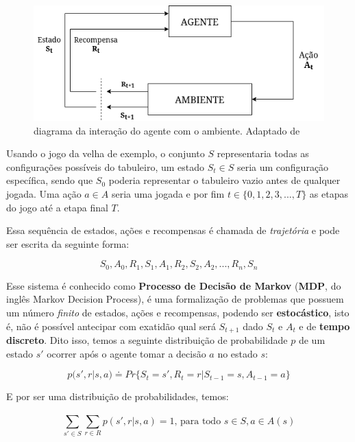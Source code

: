 \begin{figure}[h]
   \centering
   \includegraphics[scale=0.75]{figs/RL-diagram.drawio.png}
    \caption{diagrama da interação do agente com o ambiente. Adaptado de }
    \label{fig:rl-diagram}
 \end{figure}

Usando o jogo da velha de exemplo, o conjunto $S$ representaria todas as configurações possíveis do tabuleiro, um estado $S_t \in S$ seria um configuração específica, sendo que $S_0$ poderia representar o tabuleiro vazio antes de qualquer jogada. Uma ação $a \in A$ seria uma jogada e por fim $t \in \{0,1,2,3,..., T\}$ as etapas do jogo até a etapa final $T$.

Essa sequência de estados, ações e recompensas é chamada de \textit{trajetória} e pode ser escrita da seguinte forma:

\begin{equation} \label{trajectory}
   S_0, A_0, R_1, S_1, A_1, R_2, S_2, A_2, ... , R_n, S_n
\end{equation}

Esse sistema é conhecido como \textbf{Processo de Decisão de Markov} (\textbf{MDP}, do inglês Markov Decision Process), é uma formalização de problemas que possuem um número \textit{finito} de estados, ações e recompensas, podendo ser \textbf{estocástico}, isto é, não é possível antecipar com exatidão qual será $S_{t+1}$ dado $S_t$ e $A_t$ e de \textbf{tempo discreto}. Dito isso, temos a seguinte distribuição de probabilidade $p$ de um estado $s'$ ocorrer após o agente tomar a decisão $a$ no estado $s$:

\begin{equation} \label{p-definition}
   p(s', r | s, a) \doteq Pr\{S_t = s', R_t = r | S_{t-1} = s, A_{t-1} = a\}
\end{equation}

E por ser uma distribuição de probabilidades, temos: 

\begin{equation} \label{p-sum}
   \sum_{s' \in S}^{} \sum_{r \in R}^{}p(s', r | s, a) = 1 \text{, para todo } s \in S, a \in A(s) 
\end{equation}

